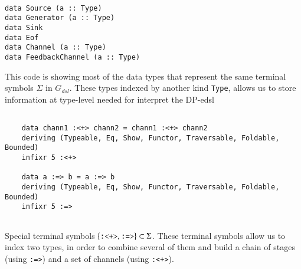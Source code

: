 \begin{listing}[H]
  \begin{verbatim}

data Source (a :: Type)
data Generator (a :: Type)
data Sink
data Eof
data Channel (a :: Type)
data FeedbackChannel (a :: Type)

  \end{verbatim}
  \caption[{[\texttt{Flow.hs}] $\Sigma$ enconding of $G_{dsl}$}]{This code is showing most of the data types that represent the same terminal symbols $\Sigma$ in $G_{dsl}$. These types indexed by another kind \texttt{Type}, allows us to store information at type-level needed for interpret the DP-\acrshort{edsl}}
  \label{src:dpfh:1}
\end{listing}
  

\begin{listing}[H]
  \begin{verbatim}
    
    data chann1 :<+> chann2 = chann1 :<+> chann2
    deriving (Typeable, Eq, Show, Functor, Traversable, Foldable, Bounded)
    infixr 5 :<+>
    
    data a :=> b = a :=> b
    deriving (Typeable, Eq, Show, Functor, Traversable, Foldable, Bounded)
    infixr 5 :=>
    
  \end{verbatim}
  \caption[{[\texttt{Flow.hs}] $\Sigma$ enconding of $G_{dsl}$ - Especial non-terminals}]{Special terminal symbols $\{\text{\texttt{:<+>}}, \text{\texttt{:=>}}\} \subset \Sigma$. These terminal symbols allow us to index two types, in order to combine several of them and build a chain of stages (using \texttt{:=>}) and a set of channels (using \texttt{:<+>}).}
  \label{src:dpfh:2}
\end{listing}

